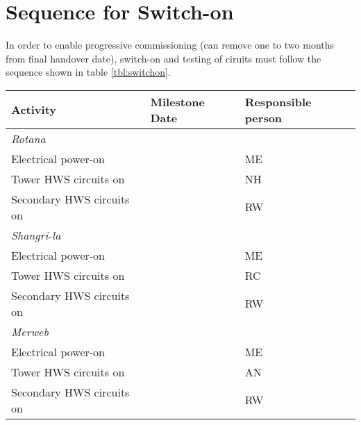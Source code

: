 \section{Sequence for Switch-on}

In order to enable progressive commissioning (can remove one to two months from final handover date), switch-on and testing of ciruits must follow the  sequence shown in table \ref{tbl:switchon}.

\begin{table*}[htbp] 
\begin{tabular}{llp{2.5cm}}
\toprule
Activity & Milestone Date & Responsible person\\
\midrule
{\em Rotana} &&\\
Electrical power-on  & &ME\\
Tower HWS  circuits on  &   &NH\\
Secondary HWS circuits on &   &RW\\
\midrule
{\em Shangri-la} &&\\
Electrical power-on    & &ME\\
Tower HWS  circuits on   &  &RC \\
Secondary HWS circuits on & &RW\\
\midrule
{\em Merweb} &&\\
Electrical power-on & & ME\\
Tower HWS  circuits on  &  &AN\\
Secondary HWS circuits on &   &RW\\
\bottomrule
\end{tabular}
\caption{Domestic water sub-systems}
\label{tbl:switchon}
\end{table*}












